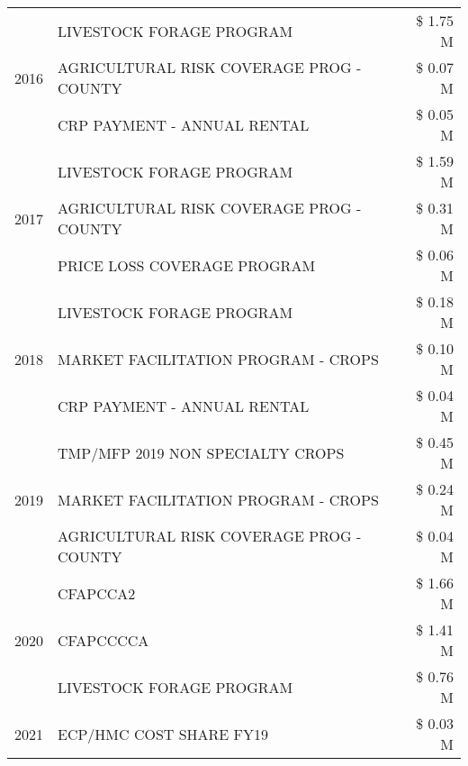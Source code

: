 \begin{tabular}{llr}
\multirow[t]{3}{*}{2016} & LIVESTOCK FORAGE PROGRAM                      & \$ 1.75 M \\
 & AGRICULTURAL RISK COVERAGE PROG - COUNTY      & \$ 0.07 M \\
 & CRP PAYMENT - ANNUAL RENTAL                   & \$ 0.05 M \\
\cline{1-3}
\multirow[t]{3}{*}{2017} & LIVESTOCK FORAGE PROGRAM & \$ 1.59 M \\
 & AGRICULTURAL RISK COVERAGE PROG - COUNTY & \$ 0.31 M \\
 & PRICE LOSS COVERAGE PROGRAM & \$ 0.06 M \\
\cline{1-3}
\multirow[t]{3}{*}{2018} & LIVESTOCK FORAGE PROGRAM & \$ 0.18 M \\
 & MARKET FACILITATION PROGRAM - CROPS & \$ 0.10 M \\
 & CRP PAYMENT - ANNUAL RENTAL & \$ 0.04 M \\
\cline{1-3}
\multirow[t]{3}{*}{2019} & TMP/MFP 2019 NON SPECIALTY CROPS & \$ 0.45 M \\
 & MARKET FACILITATION PROGRAM - CROPS & \$ 0.24 M \\
 & AGRICULTURAL RISK COVERAGE PROG - COUNTY & \$ 0.04 M \\
\cline{1-3}
\multirow[t]{3}{*}{2020} & CFAPCCA2 & \$ 1.66 M \\
 & CFAPCCCCA & \$ 1.41 M \\
 & LIVESTOCK FORAGE PROGRAM & \$ 0.76 M \\
\cline{1-3}
2021 & ECP/HMC COST SHARE FY19 & \$ 0.03 M \\
\cline{1-3}
\bottomrule
\end{tabular}
